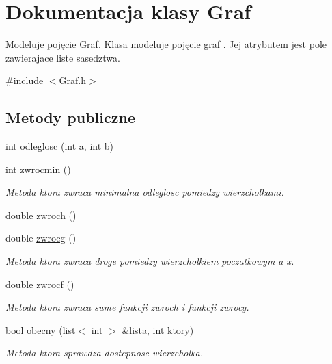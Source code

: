 \hypertarget{class_graf}{\section{Dokumentacja klasy Graf}
\label{class_graf}
}


Modeluje pojęcie \hyperlink{class_graf}{Graf}. Klasa modeluje pojęcie graf . Jej atrybutem jest pole zawierajace liste sasedztwa.  




{\ttfamily \#include $<$Graf.\-h$>$}

\subsection*{Metody publiczne}
\begin{DoxyCompactItemize}
\item 
int \hyperlink{class_graf_a8f2d2d697b7dd639708657e6c4deb388}{odleglosc} (int a, int b)
\item 
int \hyperlink{class_graf_ac00087eee459e249a5eb875cb9174db0}{zwrocmin} ()
\begin{DoxyCompactList}\small\item\em Metoda ktora zwraca minimalna odleglosc pomiedzy wierzcholkami. \end{DoxyCompactList}\item 
double \hyperlink{class_graf_a85a1a93b7853bb90374e65373cc21658}{zwroch} ()
\item 
double \hyperlink{class_graf_aa4bdae7e3634f247228d8027d993c06e}{zwrocg} ()
\begin{DoxyCompactList}\small\item\em Metoda ktora zwraca droge pomiedzy wierzcholkiem poczatkowym a x. \end{DoxyCompactList}\item 
double \hyperlink{class_graf_a96c839a91f11e176f2daabe6d02389b0}{zwrocf} ()
\begin{DoxyCompactList}\small\item\em Metoda ktora zwraca sume funkcji zwroch i funkcji zwrocg. \end{DoxyCompactList}\item 
bool \hyperlink{class_graf_a3cbc8ee97c65b37076bbc1191a263497}{obecny} (list$<$ int $>$ \&lista, int ktory)
\begin{DoxyCompactList}\small\item\em Metoda ktora sprawdza dostepnosc wierzcholka. \end{DoxyCompactList}\item 

\end{DoxyCompactItemize}
